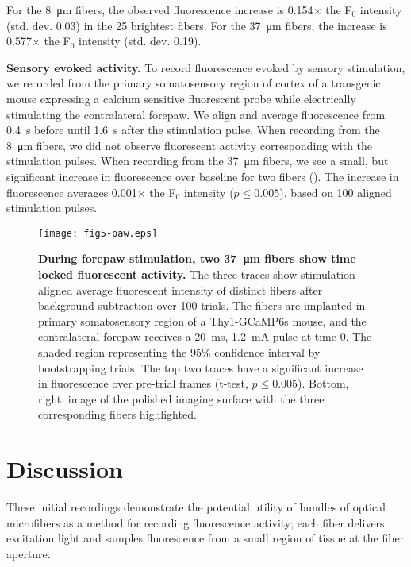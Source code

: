For the 8~\si{\micro\meter} fibers, the observed fluorescence increase
 is 0.154$\times$ the F$_0$ intensity (std. dev. 0.03) in the 25 
brightest fibers. For the 37~\si{\micro\meter} fibers, the increase is
 0.577$\times$ the F$_0$ intensity (std. dev. 0.19).

\textbf{Sensory evoked activity.} To record fluorescence evoked by sensory 
stimulation, we recorded from the primary somatosensory region of 
cortex of a transgenic mouse expressing a calcium sensitive 
fluorescent probe while electrically stimulating the contralateral 
forepaw. We align and average fluorescence from 0.4~s before until 
1.6~s after the stimulation pulse. When recording from the 
8~\si{\micro\meter} fibers, we did not observe fluorescent activity 
corresponding with the stimulation pulses. When recording from the 
37~\si{\micro\meter} fibers, we see a small, but significant increase 
in fluorescence over baseline for two fibers (). The increase in 
fluorescence averages 0.001$\times$ the F$_0$ intensity ($p \leq 0.005$), based 
on 100 aligned stimulation pulses.

\begin{figure}
\texttt{[image: fig5-paw.eps]}
\caption[Recording of fluorescence during forepaw stimulation]{\textbf{During forepaw stimulation, two 37~\si{\micro\meter} fibers show time 
locked fluorescent activity.} The three traces show stimulation-aligned
 average fluorescent intensity of distinct fibers after background 
subtraction over 100 trials. The fibers are implanted in primary 
somatosensory region of a Thy1-GCaMP6s mouse, and the contralateral 
forepaw receives a 20~ms, 1.2~\si{\milli\ampere} pulse at time 0. The 
shaded region representing the 95\% confidence interval by 
bootstrapping trials. The top two traces have a significant increase 
in fluorescence over pre-trial frames (t-test, $p \leq 0.005$). Bottom, right:
 image of the polished imaging surface with the three corresponding 
fibers highlighted.}
\label{fig:paw}
\end{figure}

\section{Discussion}

These initial recordings demonstrate the potential utility of bundles 
of optical microfibers as a method for recording fluorescence 
activity; each fiber delivers excitation light and samples 
fluorescence from a small region of tissue at the fiber aperture.

